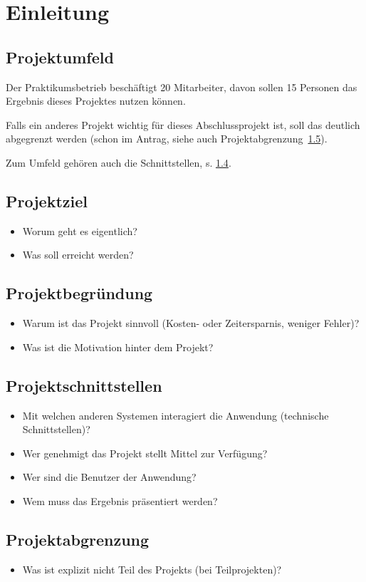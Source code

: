 \section{Einleitung}
\label{sec:Einleitung}


\subsection{Projektumfeld} 
\label{sec:Projektumfeld}
Der Praktikumsbetrieb beschäftigt 20 Mitarbeiter, davon sollen 15 Personen das Ergebnis dieses Projektes nutzen können.

Falls ein anderes Projekt wichtig für dieses Abschlussprojekt ist, soll das deutlich abgegrenzt werden (\bzw schon im Antrag, siehe auch Projektabgrenzung~\ref{sec:Projektabgrenzung}).

Zum Umfeld gehören auch die Schnittstellen, s. \ref{sec:Projektschnittstellen}.

\subsection{Projektziel} 
\label{sec:Projektziel}
\begin{itemize}
	\item Worum geht es eigentlich?
	\item Was soll erreicht werden?
\end{itemize}


\subsection{Projektbegründung} 
\label{sec:Projektbegruendung}
\begin{itemize}
	\item Warum ist das Projekt sinnvoll (\zB Kosten- oder Zeitersparnis, weniger Fehler)?
	\item Was ist die Motivation hinter dem Projekt?
\end{itemize}


\subsection{Projektschnittstellen} 
\label{sec:Projektschnittstellen}
\begin{itemize}
	\item Mit welchen anderen Systemen interagiert die Anwendung (technische Schnittstellen)?
	\item Wer genehmigt das Projekt \bzw stellt Mittel zur Verfügung? 
	\item Wer sind die Benutzer der Anwendung?
	\item Wem muss das Ergebnis präsentiert werden?
\end{itemize}


\subsection{Projektabgrenzung} 
\label{sec:Projektabgrenzung}
\begin{itemize}
	\item Was ist explizit nicht Teil des Projekts (\insb bei Teilprojekten)?
\end{itemize}
